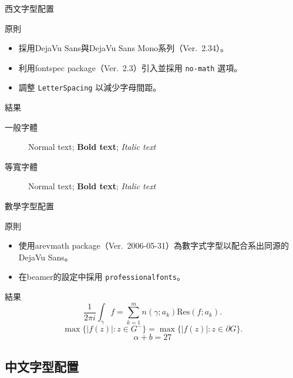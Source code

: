 \documentclass[10pt, aspectratio=1610]{beamer}
\begin{document}
\begin{frame}{西文字型配置}
\begin{block}{原則}
\begin{itemize}
\item 採用DejaVu Sans與DejaVu Sans Mono系列（Ver.~2.34）。
\item 利用fontspec package（Ver.~2.3）引入並採用 \texttt{no-math} 選項。
\item 調整 \texttt{LetterSpacing} 以減少字母間距。
\end{itemize}
\end{block}
\begin{block}{結果}
\begin{description}
\item[一般字體] Normal text; \textbf{Bold text}; \textit{Italic text}
\item[等寬字體] {\ttfamily Normal text; \textbf{Bold text}; \textit{Italic text}}
\end{description}
\end{block}
\end{frame}

\begin{frame}{數學字型配置}
\begin{block}{原則}
\begin{itemize}
\item 使用arevmath package（Ver.~2006-05-31）為數字式字型以配合系出同源的DejaVu Sans。
\item 在beamer的設定中採用 \texttt{professionalfonts}。
\end{itemize}
\end{block}
\begin{block}{結果}
\[
\frac{1}{2\pi i}\int_\gamma f = \sum_{k=1}^m n(\gamma;a_k) \text{Res}(f;a_k).
\]
\[
\max\{|f(z)|:z\in G^-\}=\max \{|f(z)|:z\in \partial G \}.
\]
\boldmath\[  \alpha + b = 27 \]
\end{block}
\end{frame}

\subsection{中文字型配置}
\end{document}
